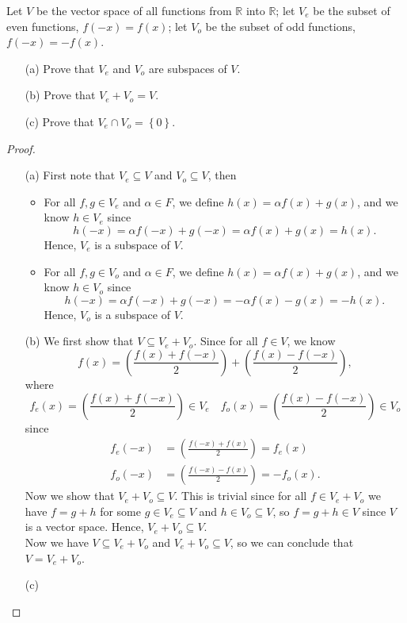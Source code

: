 \begin{problem}
Let \(V\) be the vector space of all functions from \(\mathbb{R} \)  into \(\mathbb{R} \); let \(V_e\) be the subset of even functions, \(f(-x) = f(x)\); let \(V_o\) be the subset of odd functions, \(f(-x) = -f(x)\).
\begin{itemize}
    \item [(a)] Prove that \(V_e\) and \(V_o\) are subspaces of \(V\). 
    \item [(b)] Prove that \(V_e + V_o = V\). 
    \item [(c)] Prove that \(V_e \cap V_o = \left\{ 0 \right\} \).     
\end{itemize}
\end{problem}
\begin{proof}
    \vphantom{text}
\begin{itemize}
    \item [(a)] First note that \(V_e \subseteq V\) and \(V_o \subseteq V\), then   
    \begin{itemize}[\(\bullet\) ]
        \item For all \(f, g \in V_e\) and \(\alpha \in F\), we define \(h(x) = \alpha f(x) + g(x)\), and we know \(h \in V_e\) since
        \[
            h(-x) = \alpha f(-x) + g(-x) = \alpha f(x) + g(x) = h(x).
        \]
        Hence, \(V_e\) is a subspace of \(V\).  
        \item For all \(f, g \in V_o\) and \(\alpha \in F\), we define \(h(x) = \alpha f(x) + g(x)\), and we know \(h \in V_o\) since
        \[
            h(-x) = \alpha f(-x) + g(-x) = -\alpha f(x) - g(x) = -h(x).
        \]
        Hence, \(V_o\) is a subspace of \(V\).  
    \end{itemize}
    \item [(b)] We first show that \(V \subseteq V_e + V_o\). Since for all \(f \in V\), we know 
    \[
        f(x) = \left( \frac{f(x) + f(-x)}{2} \right) + \left( \frac{f(x) - f(-x)}{2} \right), 
    \]  where 
    \[
        f_e(x) = \left( \frac{f(x) + f(-x)}{2} \right) \in V_e \quad f_o(x) = \left( \frac{f(x) - f(-x)}{2} \right) \in V_o
    \] since 
    \begin{align*}
        f_e(-x) &= \left( \frac{f(-x) + f(x)}{2} \right) = f_e(x) \\
        f_o(-x) &= \left( \frac{f(-x) - f(x)}{2} \right) = -f_o(x) .
    \end{align*}
    Now we show that \(V_e + V_o \subseteq V\). This is trivial since for all \(f \in V_e + V_o\) we have \(f = g + h\) for some \(g \in V_e \subseteq V\) and \(h \in V_o \subseteq V\), so \(f = g+h \in V\) since \(V\) is a vector space. Hence, \(V_e + V_o \subseteq V\). \\
    Now we have \(V \subseteq V_e + V_o\) and \(V_e + V_o \subseteq V\), so we can conclude that \(V = V_e + V_o\).   
    \item [(c)]
\end{itemize}   
\end{proof}

